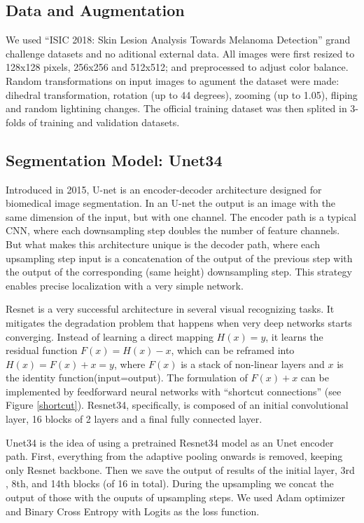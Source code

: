 \documentclass[conference]{IEEEtran}
\begin{document}
\subsection{Data and Augmentation}
We used “ISIC 2018: Skin Lesion Analysis Towards Melanoma Detection” grand challenge datasets \cite{codella, ham} and no aditional external data. All images were first resized to 128x128 pixels, 256x256 and 512x512; and preprocessed to adjust color balance. Random transformations on input images to agument the dataset were made: dihedral transformation, rotation (up to 44 degrees), zooming (up to 1.05), fliping and random lightining changes. The official training dataset was then splited in 3-folds of training and validation datasets.  

\subsection{Segmentation Model: Unet34}
Introduced in 2015, U-net is an encoder-decoder architecture designed for biomedical image segmentation\cite{olaf}. In an U-net the output is an image with the same dimension of the input, but with one channel.  The encoder path is a typical CNN, where each downsampling step doubles the number of feature channels. But what makes this architecture unique is the decoder path, where each upsampling step input is a concatenation of the output of the previous step with the output of the corresponding (same height) downsampling step. This strategy enables precise localization with a very simple network. 

Resnet is a very successful architecture in several visual recognizing tasks\cite{he}. It mitigates the degradation problem that happens when very deep networks starts converging. Instead of learning a direct mapping $H(x) = y$, it learns the residual function  $F(x) = H(x)-x$, which can be reframed into $H(x) = F(x)+x = y$, where $F(x)$ is a stack of non-linear layers and $x$ is the identity function(input=output). The formulation of $F(x)+x$ can be implemented by feedforward neural networks with “shortcut connections” (see Figure \ref{shortcut}). Resnet34, specifically, is composed of an initial convolutional layer, 16 blocks of 2 layers and a final fully connected layer.

Unet34 is the idea of using a pretrained Resnet34 model as an Unet encoder path\cite{fastai}. First, everything from the adaptive pooling onwards is removed, keeping only Resnet backbone. Then we save the output of results of the initial layer, 3rd , 8th, and 14th blocks (of 16 in total). During the upsampling we concat the output of those with the ouputs of upsampling steps. We used Adam optimizer and Binary Cross Entropy with Logits as the loss function.
\end{document}
